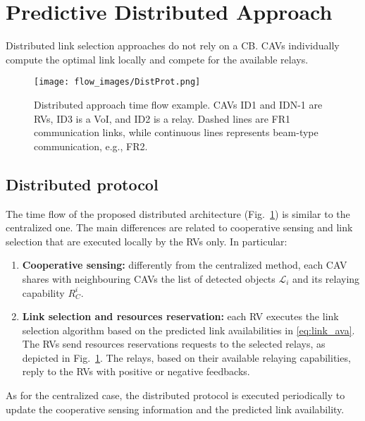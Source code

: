 \documentclass[journal]{IEEEtran}
\begin{document}
\section{Predictive Distributed Approach}\label{sec:Distributed}

Distributed link selection approaches do not rely on a CB. CAVs individually compute the optimal link locally and compete for the available relays. 
\begin{figure} [t!]
    \centering
    \texttt{[image: flow\_images/DistProt.png]}
    \caption{Distributed approach time flow example. CAVs ID1 and IDN-1 are RVs, ID3 is a VoI, and ID2 is a relay. Dashed lines are FR1 communication links, while continuous lines represents beam-type communication, e.g., FR2.}
    \label{fig:Distrib}
\end{figure}

\subsection{Distributed protocol}

The time flow of the proposed distributed architecture (Fig.~\ref{fig:Distrib}) is similar to the centralized one. The main differences are related to cooperative sensing and link selection %
that are executed locally by the RVs only. In particular:
\begin{enumerate}[wide]
    \item \textbf{Cooperative sensing:} differently from the centralized method, each CAV shares with neighbouring CAVs the list of detected objects $\mathcal{L}_i$ and its relaying capability $R_C^i$. %
    
    \item \textbf{Link selection and resources reservation:} each RV executes the link selection algorithm based on the predicted link availabilities in \eqref{eq:link_ava}. The RVs send resources reservations requests to the selected relays, as depicted in Fig.~\ref{fig:Distrib}. The relays, based on their available relaying capabilities, reply to the RVs with positive or negative feedbacks.
\end{enumerate}
As for the centralized case, the distributed protocol is executed periodically to update the cooperative sensing information and the predicted link availability.
\end{document}

